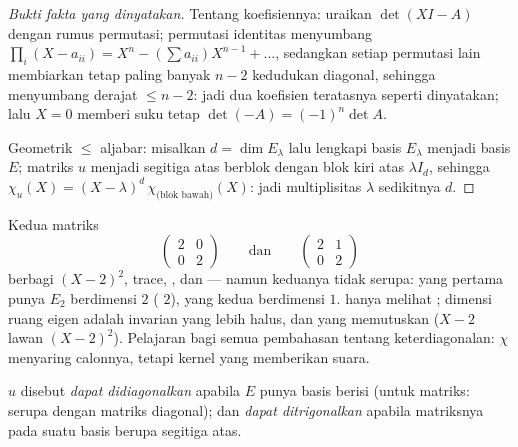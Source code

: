 \begin{proof}[Bukti fakta yang dinyatakan]
Tentang koefisiennya: uraikan $\det(XI - A)$ dengan rumus
permutasi; permutasi identitas menyumbang $\prod_i (X - a_{ii})
= X^n - (\sum a_{ii})X^{n-1} + \dots$, sedangkan setiap permutasi lain
membiarkan tetap paling banyak $n - 2$ kedudukan diagonal, sehingga
menyumbang derajat $\leq n - 2$: jadi dua koefisien teratasnya seperti
dinyatakan; lalu $X = 0$ memberi suku tetap $\det(-A) = (-1)^n\det A$.

Geometrik $\leq$ aljabar: misalkan $d = \dim E_\lambda$ lalu lengkapi
basis $E_\lambda$ menjadi basis $E$; matriks $u$ menjadi segitiga atas
berblok dengan blok kiri atas $\lambda I_d$, sehingga $\chi_u(X) =
(X - \lambda)^d\, \chi_{\text{(blok bawah)}}(X)$: jadi multiplisitas
$\lambda$ sedikitnya $d$.
\end{proof}

\begin{example}\label{ex:b2:reduction:samechi}
Kedua matriks
\[
\begin{pmatrix}2 & 0\\ 0 & 2\end{pmatrix}
\qquad\text{dan}\qquad
\begin{pmatrix}2 & 1\\ 0 & 2\end{pmatrix}
\]
berbagi  $(X - 2)^2$, trace,
, dan  --- namun keduanya tidak serupa: yang pertama
punya $E_2$ berdimensi $2$ ( $2$), yang kedua
berdimensi $1$.  hanya melihat
; dimensi ruang eigen adalah invarian yang
lebih halus, dan  yang memutuskan ($X - 2$
lawan $(X - 2)^2$). Pelajaran bagi semua pembahasan tentang
keterdiagonalan: $\chi$ menyaring calonnya, tetapi kernel yang
memberikan suara.
\end{example}

\begin{definition}\label{def:b2:reduction:diag}
$u$ disebut \emph{dapat didiagonalkan} apabila
$E$ punya basis berisi  (untuk matriks: serupa dengan matriks
diagonal); dan \emph{dapat ditrigonalkan} apabila
matriksnya pada suatu basis berupa segitiga atas.
\end{definition}

